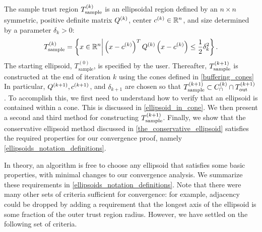 The sample trust region ${T_{\text{sample}}^{(k)}}$ is an ellipsoidal region defined by an $n\times n$ symmetric, positive definite matrix ${Q^{(k)}}$, center $c^{(k)} \in \mathbb R^n$, 
and size determined by a parameter $\delta_{k} > 0$:
\begin{align}
{T_{\text{sample}}^{(k)}} = \left \{x \in \mathbb R^n \bigg | \left(x - c^{(k)}\right)^T {Q^{(k)}}\left(x - c^{(k)}\right) \le \frac 1 2 \delta_k^2 \right \}. \label{define_sampletrk}
\end{align}
The starting ellipsoid,  $T_{\text{sample}}^{(0)}$,  is specified by the user.
Thereafter,  ${T_{\text{sample}}^{(k+1)}}$ is constructed at the end of iteration $k$ using the cones defined in \cref{buffering_cones}
In particular,  ${Q^{(k+1)}},{c^{(k+1)}}$, and $\delta_{k+1}$ are chosen so that ${T_{\text{sample}}^{(k+1)}}  \subset {C^{(k)}_{\cap}} \cap {T_{\text{out}}^{(k+1)}}$.
To accomplish this, we first need to understand how to verify that an ellipsoid is contained within a cone.
This is discussed in \cref{ellipsoid_in_cone}.
We then present a second and third method for constructing ${T_{\text{sample}}^{(k+1)}}$.
Finally, we show that the conservative ellipsoid method discussed in \cref{the_conservative_ellipsoid} satisfies the 
required properties for our convergence proof, namely \cref{ellipsoids_notation_definitions}.

In theory, an algorithm is free to choose any ellipsoid that satisfies some basic properties, with minimal changes to our convergence analysis.
We summarize these requirements in \cref{ellipsoids_notation_definitions}.
Note that there were many other sets of criteria sufficient for convergence:
for example, adjacency could be dropped by adding a requirement that the longest axis of the ellipsoid is some fraction of the outer trust region radius.
However, we have settled on the following set of criteria.


